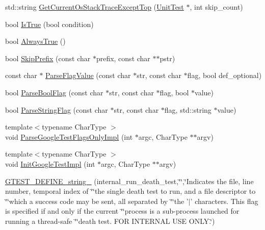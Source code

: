 \begin{DoxyCompactItemize}
\item 
std\-::string \hyperlink{namespacetesting_1_1internal_a7ca65eb9f24d89fbc1e8cb108d3c6339}{Get\-Current\-Os\-Stack\-Trace\-Except\-Top} (\hyperlink{classtesting_1_1_unit_test}{Unit\-Test} $\ast$, int skip\-\_\-count)
\item 
bool \hyperlink{namespacetesting_1_1internal_a527b9bcc13669b9a16400c8514266254}{Is\-True} (bool condition)
\item 
bool \hyperlink{namespacetesting_1_1internal_a922c9da63cd4bf94fc473b9ecac76414}{Always\-True} ()
\item 
bool \hyperlink{namespacetesting_1_1internal_a244d9a3765727306b597b8992ab84036}{Skip\-Prefix} (const char $\ast$prefix, const char $\ast$$\ast$pstr)
\item 
const char $\ast$ \hyperlink{namespacetesting_1_1internal_a72518f8c6521a4af1b41215e0fca011c}{Parse\-Flag\-Value} (const char $\ast$str, const char $\ast$flag, bool def\-\_\-optional)
\item 
bool \hyperlink{namespacetesting_1_1internal_ada3b98e7cfe93f4ba2053c470d9e3e51}{Parse\-Bool\-Flag} (const char $\ast$str, const char $\ast$flag, bool $\ast$value)
\item 
bool \hyperlink{namespacetesting_1_1internal_aa4ce312efaaf7a97aac2303173afe021}{Parse\-String\-Flag} (const char $\ast$str, const char $\ast$flag, std\-::string $\ast$value)
\item 
{\footnotesize template$<$typename Char\-Type $>$ }\\void \hyperlink{namespacetesting_1_1internal_ae4c46ce8c3d016848fff52cc5133f2ac}{Parse\-Google\-Test\-Flags\-Only\-Impl} (int $\ast$argc, Char\-Type $\ast$$\ast$argv)
\item 
{\footnotesize template$<$typename Char\-Type $>$ }\\void \hyperlink{namespacetesting_1_1internal_ac3c6fa93391768aa91c6238b31aaeeb5}{Init\-Google\-Test\-Impl} (int $\ast$argc, Char\-Type $\ast$$\ast$argv)
\item 
\hyperlink{namespacetesting_1_1internal_a1b4d550272b7346726a5b4976d5c7aca}{G\-T\-E\-S\-T\-\_\-\-D\-E\-F\-I\-N\-E\-\_\-string\-\_\-} (internal\-\_\-run\-\_\-death\-\_\-test,\char`\"{}\char`\"{},\char`\"{}Indicates the file, line number, temporal index of \char`\"{}\char`\"{}the single death test to run, and a file descriptor to \char`\"{}\char`\"{}which a success code may be sent, all separated by \char`\"{}\char`\"{}the '$\vert$' characters.  This flag is specified if and only if the current \char`\"{}\char`\"{}process is a sub-\/process launched for running a thread-\/safe \char`\"{}\char`\"{}death test.  F\-O\-R I\-N\-T\-E\-R\-N\-A\-L U\-S\-E O\-N\-L\-Y.\char`\"{})
$$
\end{DoxyCompactItemize}
